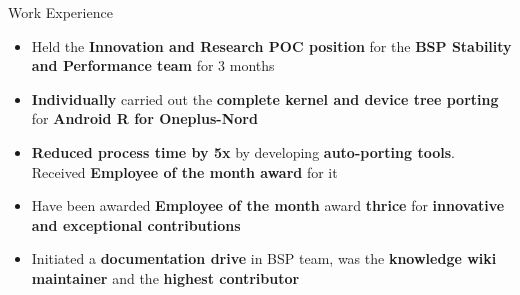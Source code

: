 \begin{rSection}{Work Experience}
\begin{itemize}[leftmargin=*]
	\item Held the {\bf Innovation and Research POC position} for the {\bf BSP Stability
		and Performance team} for 3 months
	
	\item {\bf Individually} carried out the {\bf complete kernel and device tree
		porting} for {\bf Android R for Oneplus-Nord}
	
	\item {\bf Reduced process time by 5x} by developing {\bf auto-porting tools}. Received {\bf Employee of the month award} for
		it
		
	\item Have been awarded {\bf Employee of the month} award {\bf thrice} for {\bf innovative and exceptional
		contributions}

	\item Initiated a {\bf documentation drive} in BSP team, was the
		{\bf knowledge wiki maintainer} and the {\bf highest
		contributor}

\end{itemize}

\end{rSection}

